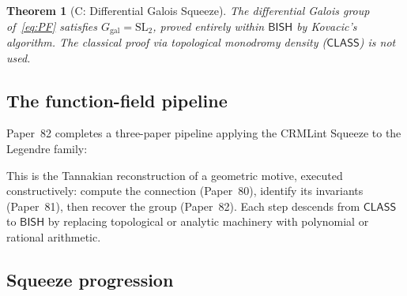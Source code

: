 \documentclass[11pt]{article}
\theoremstyle{plain}
\newtheorem{theorem}{Theorem}[section]
\theoremstyle{definition}
\theoremstyle{remark}
\newcommand{\SL}{\mathrm{SL}}
\newcommand{\Ggal}{G_{\mathrm{gal}}}
\newcommand{\BISH}{\mathsf{BISH}}
\newcommand{\CLASS}{\mathsf{CLASS}}
\begin{document}
\begin{theorem}[C: Differential Galois Squeeze]\label{thm:C}
The differential Galois group of~\eqref{eq:PF} satisfies $\Ggal = \SL_2$, proved entirely within $\BISH$ by Kovacic's algorithm.
The classical proof via topological monodromy density ($\CLASS$) is not used.
\end{theorem}

\subsection{The function-field pipeline}

Paper~82 completes a three-paper pipeline applying the CRMLint Squeeze to the Legendre family:

\begin{center}
\end{center}

\noindent
This is the Tannakian reconstruction of a geometric motive, executed constructively: compute the connection (Paper~80), identify its invariants (Paper~81), then recover the group (Paper~82).
Each step descends from $\CLASS$ to $\BISH$ by replacing topological or analytic machinery with polynomial or rational arithmetic.

\subsection{Squeeze progression}
\end{document}
